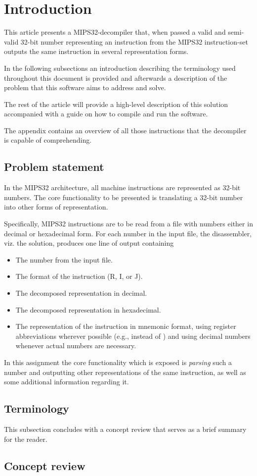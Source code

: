 \section{Introduction}

This article presents a MIPS32-decompiler that, when passed a valid
and semi-valid 32-bit number representing an instruction from the
MIPS32 instruction-set outputs the same instruction in several
representation forms.

In the following subsections an introduction describing the
terminology used throughout this document is provided and afterwards
a description of the problem that this software aims to address
and solve.

The rest of the article will provide a high-level description of this
solution accompanied with a guide on how to compile and run the
software.

The appendix contains an overview of all those instructions that
the decompiler is capable of comprehending.

\subsection{Problem statement}

In the MIPS32 architecture, all machine instructions are represented
as 32-bit numbers. The core functionality to be presented is translating
a 32-bit number into other forms of representation.

Specifically, MIPS32 instructions are to be read from a file with
numbers either in decimal or hexadecimal form. For each number
in the input file, the disassembler, viz. the solution, produces
one line of output containing

\begin{itemize}
  \item The number from the input file.
  \item The format of the instruction (R, I, or J).
  \item The decomposed representation in decimal.
  \item The decomposed representation in hexadecimal.
  \item The representation of the instruction in mnemonic format,
    using register abbreviations wherever possible (e.g.,
     instead of ) and using decimal numbers
    whenever actual numbers are necessary.
\end{itemize}

In this assignment the core functionality which is exposed is
\emph{parsing} such a number and outputting other representations of
the same instruction, as well as some additional information regarding
it.

\subsection{Terminology}

This subsection concludes with a concept review that serves as a brief
summary for the reader.


\subsection{Concept review}
